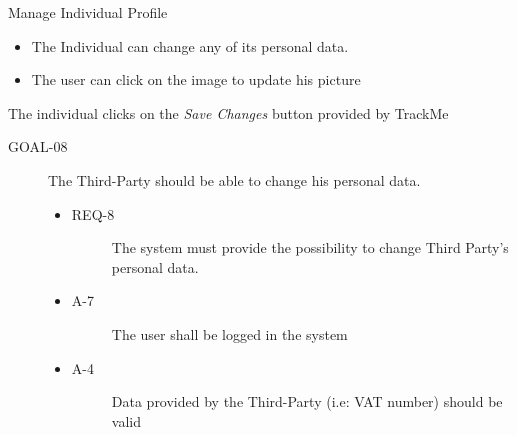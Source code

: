 \documentclass[a4paper]{article}
\newcommand{\requirement}{\ding{229}}%
\begin{document}
      
       \begin{usecase}{Manage Individual Profile}
        {\begin{itemize}
            \item The Individual can change any of its personal data.
            \item The user can click on the image to update his picture
        \end{itemize}}
        {The individual clicks on the \textit{Save Changes} button provided by TrackMe}
       \end{usecase}
       
       \begin{description}
        	\item[GOAL-08] The Third-Party should be able to change his personal data. 
            	\begin{itemize}
            	    \item[\requirement]
                	\begin{description}
                	\item[REQ-8] The system must provide the possibility to change Third Party's personal data. 
                	\end{description}
                	\item
                	\begin{description}
                	\item[A-7] The user shall be logged in the system
                	\end{description}
                	\item
                	\begin{description}
                	\item[A-4] Data  provided  by  the  Third-Party  (i.e:  VAT  number)  should be valid
                	\end{description}
                	\end{itemize}
        \end{description}
       
\end{document}
